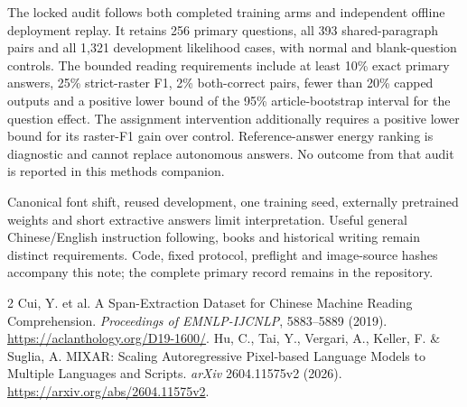 \documentclass[10pt,a4paper,twocolumn]{article}
\begin{document}
The locked audit follows both completed training arms and independent offline
deployment replay. It retains 256 primary questions, all 393 shared-paragraph
pairs and all 1,321 development likelihood cases, with normal and blank-question
controls. The bounded reading requirements include at least 10\% exact primary
answers, 25\% strict-raster F1, 2\% both-correct pairs, fewer than 20\% capped
outputs and a positive lower bound of the 95\% article-bootstrap interval for
the question effect.
The assignment intervention additionally requires a positive lower bound for
its raster-F1 gain over control. Reference-answer energy ranking is diagnostic
and cannot replace autonomous answers. No outcome from that audit is reported
in this methods companion.

Canonical font shift, reused development, one training seed, externally
pretrained weights and short extractive answers limit interpretation. Useful
general Chinese/English instruction following, books and historical writing
remain distinct requirements. Code, fixed protocol, preflight and image-source
hashes accompany this note; the complete primary record remains in the
repository.

\begin{thebibliography}{2}
 Cui, Y. et al. A Span-Extraction Dataset for Chinese Machine
Reading Comprehension. \emph{Proceedings of EMNLP-IJCNLP}, 5883--5889 (2019).
\url{https://aclanthology.org/D19-1600/}.
 Hu, C., Tai, Y., Vergari, A., Keller, F. \& Suglia, A. MIXAR:
Scaling Autoregressive Pixel-based Language Models to Multiple Languages and
Scripts. \emph{arXiv} 2604.11575v2 (2026).
\url{https://arxiv.org/abs/2604.11575v2}.
\end{thebibliography}
\end{document}
